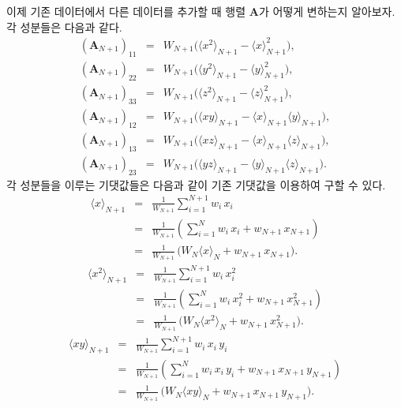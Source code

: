 \documentclass[chapter,a4paper,10pt]{oblivoir}
\begin{document}
이제 기존 데이터에서 다른 데이터를 추가할 때 행렬 $\mathbf{A}$가 어떻게 변하는지 알아보자. 각 성분들은 다음과 같다.
\begin{eqnarray}
\left(\mathbf{A}_{N+1}\right)_{11} &=& W_{N+1}\Big(\langle x^2 \rangle_{N+1} -\langle x \rangle_{N+1}^2\Big), \\
\left(\mathbf{A}_{N+1}\right)_{22} &=& W_{N+1}\Big(\langle y^2 \rangle_{N+1} -\langle y \rangle_{N+1}^2\Big), \\
\left(\mathbf{A}_{N+1}\right)_{33} &=& W_{N+1}\Big(\langle z^2 \rangle_{N+1} -\langle z \rangle_{N+1}^2\Big), \\
\left(\mathbf{A}_{N+1}\right)_{12} &=& W_{N+1} \Big(\langle xy \rangle_{N+1} -\langle x \rangle_{N+1}\langle y \rangle_{N+1} \Big), \\
\left(\mathbf{A}_{N+1}\right)_{13} &=& W_{N+1} \Big(\langle xz \rangle_{N+1} -\langle x \rangle_{N+1}\langle z \rangle_{N+1} \Big), \\
\left(\mathbf{A}_{N+1}\right)_{23} &=& W_{N+1} \Big(\langle yz \rangle_{N+1} -\langle y \rangle_{N+1}\langle z \rangle_{N+1} \Big). 
\end{eqnarray}
각 성분들을 이루는 기댓값들은 다음과 같이 기존 기댓값을 이용하여 구할 수 있다.
\begin{eqnarray}
\langle x \rangle_{N+1} &=& \frac{1}{W_{N+1}}\sum_{i=1}^{N+1}w_i\,x_i \\
&=& \frac{1}{W_{N+1}}\left(\sum_{i=1}^{N}w_i\,x_i + w_{N+1}\,x_{N+1}\right)\nonumber\\
&=& \frac{1}{W_{N+1}}\,\Big(W_N\langle x \rangle_N + w_{N+1}\,x_{N+1}\Big).\nonumber
\end{eqnarray}
\begin{eqnarray}
\langle x^2 \rangle_{N+1} &=& \frac{1}{W_{N+1}}\sum_{i=1}^{N+1}w_i\,x_i^2 \\
&=& \frac{1}{W_{N+1}}\left(\sum_{i=1}^{N}w_i\,x_i^2 + w_{N+1}\,x_{N+1}^2\right)\nonumber\\
&=& \frac{1}{W_{N+1}}\,\Big(W_N\langle x^2 \rangle_N + w_{N+1}\,x_{N+1}^2\Big).\nonumber
\end{eqnarray}
\begin{eqnarray}
\langle xy \rangle_{N+1} &=& \frac{1}{W_{N+1}}\sum_{i=1}^{N+1}w_i\,x_i\,y_i \\
&=& \frac{1}{W_{N+1}}\left(\sum_{i=1}^{N}w_i\,x_i\,y_i + w_{N+1}\,x_{N+1}\,y_{N+1}\right)\nonumber\\
&=& \frac{1}{W_{N+1}}\,\Big(W_N\langle xy \rangle_N + w_{N+1}\,x_{N+1}\,y_{N+1}\Big).\nonumber
\end{eqnarray}
\end{document}
